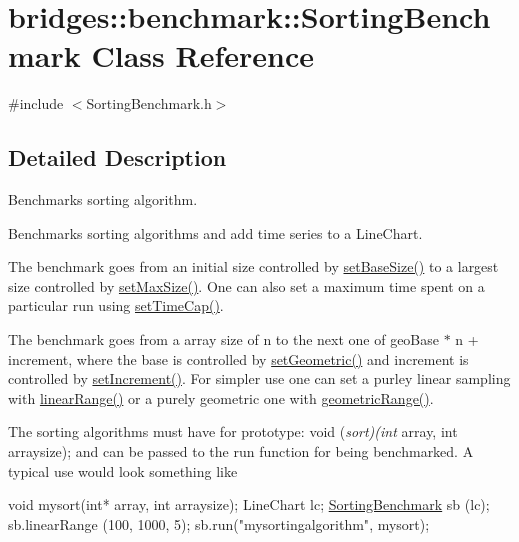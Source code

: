 \hypertarget{classbridges_1_1benchmark_1_1_sorting_benchmark}{}\section{bridges\+:\+:benchmark\+:\+:Sorting\+Benchmark Class Reference}
\label{classbridges_1_1benchmark_1_1_sorting_benchmark}


{\ttfamily \#include $<$Sorting\+Benchmark.\+h$>$}



\subsection{Detailed Description}
Benchmarks sorting algorithm. 

Benchmarks sorting algorithms and add time series to a Line\+Chart.

The benchmark goes from an initial size controlled by \mbox{\hyperlink{classbridges_1_1benchmark_1_1_sorting_benchmark_afe0474d148c185ed1e479ff11f42ae51}{set\+Base\+Size()}} to a largest size controlled by \mbox{\hyperlink{classbridges_1_1benchmark_1_1_sorting_benchmark_abdca289b823c7f240b648e248c07b059}{set\+Max\+Size()}}. One can also set a maximum time spent on a particular run using \mbox{\hyperlink{classbridges_1_1benchmark_1_1_sorting_benchmark_a59b95f2510d62ac5a31bb33d472fdffc}{set\+Time\+Cap()}}.

The benchmark goes from a array size of n to the next one of geo\+Base $\ast$ n + increment, where the base is controlled by \mbox{\hyperlink{classbridges_1_1benchmark_1_1_sorting_benchmark_ade76a5749b07d35b02623cce27c046ab}{set\+Geometric()}} and increment is controlled by \mbox{\hyperlink{classbridges_1_1benchmark_1_1_sorting_benchmark_ae168533dc5756f3ede3436bdd7840047}{set\+Increment()}}. For simpler use one can set a purley linear sampling with \mbox{\hyperlink{classbridges_1_1benchmark_1_1_sorting_benchmark_a993de51c8b82ec50eb186afef5dc7003}{linear\+Range()}} or a purely geometric one with \mbox{\hyperlink{classbridges_1_1benchmark_1_1_sorting_benchmark_a32fa712ee712b633aabfd7bcaa83008a}{geometric\+Range()}}.

The sorting algorithms must have for prototype\+: void ({\itshape sort)(int} array, int arraysize); and can be passed to the run function for being benchmarked. A typical use would look something like


\begin{DoxyCode}
\textcolor{keywordtype}{void} mysort(\textcolor{keywordtype}{int}* array, \textcolor{keywordtype}{int} arraysize);
LineChart lc;
\mbox{\hyperlink{classbridges_1_1benchmark_1_1_sorting_benchmark_aed5731a3b5add3a7f4c80891b22b3093}{SortingBenchmark}} sb (lc);
sb.linearRange (100, 1000, 5);
sb.run(\textcolor{stringliteral}{"mysortingalgorithm"}, mysort);
\end{DoxyCode}


